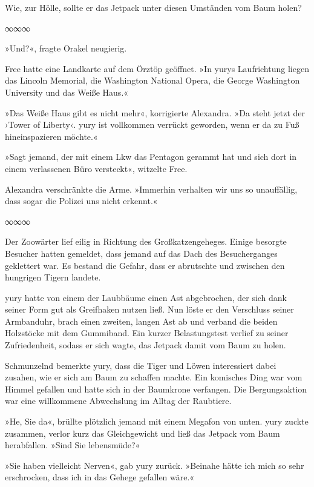 Wie, zur Hölle, sollte er das Jetpack unter diesen Umständen vom Baum holen?

\begin{center}
∞∞∞
\end{center}

»Und?«, fragte Orakel neugierig.

Free hatte eine Landkarte auf dem Örztöp geöffnet. »In yurys Laufrichtung liegen das Lincoln Memorial, die Washington National Opera, die George Washington University und das Weiße Haus.«

»Das Weiße Haus gibt es nicht mehr«, korrigierte Alexandra. »Da steht jetzt der ›Tower of Liberty‹. yury ist vollkommen verrückt geworden, wenn er da zu Fuß hineinspazieren möchte.«

»Sagt jemand, der mit einem Lkw das Pentagon gerammt hat und sich dort in einem verlassenen Büro versteckt«, witzelte Free.

Alexandra verschränkte die Arme. »Immerhin verhalten wir uns so unauffällig, dass sogar die Polizei uns nicht erkennt.«

\begin{center}
∞∞∞
\end{center}

Der Zoowärter lief eilig in Richtung des Großkatzengeheges. Einige besorgte Besucher hatten gemeldet, dass jemand auf das Dach des Besucherganges geklettert war. Es bestand die Gefahr, dass er abrutschte und zwischen den hungrigen Tigern landete.

yury hatte von einem der Laubbäume einen Ast abgebrochen, der sich dank seiner Form gut als Greifhaken nutzen ließ. Nun löste er den Verschluss seiner Armbanduhr, brach einen zweiten, langen Ast ab und verband die beiden Holzstöcke mit dem Gummiband. Ein kurzer Belastungstest verlief zu seiner Zufriedenheit, sodass er sich wagte, das Jetpack damit vom Baum zu holen.

Schmunzelnd bemerkte yury, dass die Tiger und Löwen interessiert dabei zusahen, wie er sich am Baum zu schaffen machte. Ein komisches Ding war vom Himmel gefallen und hatte sich in der Baumkrone verfangen. Die Bergungsaktion war eine willkommene Abwechslung im Alltag der Raubtiere.

»He, Sie da«, brüllte plötzlich jemand mit einem Megafon von unten. yury zuckte zusammen, verlor kurz das Gleichgewicht und ließ das Jetpack vom Baum herabfallen. »Sind Sie lebensmüde?«

»Sie haben vielleicht Nerven«, gab yury zurück. »Beinahe hätte ich mich so sehr erschrocken, dass ich in das Gehege gefallen wäre.«

